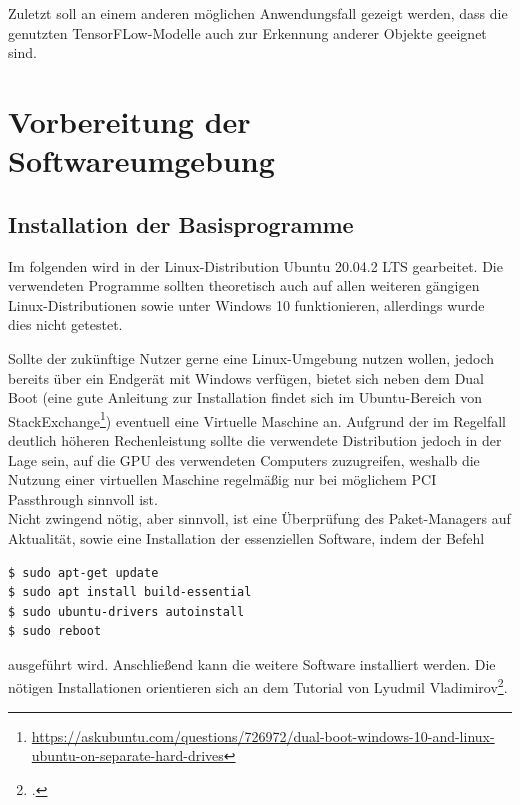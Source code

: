 \documentclass[12pt, oneside]{article}
\begin{document}
Zuletzt soll an einem anderen möglichen Anwendungsfall gezeigt werden, dass die genutzten TensorFLow-Modelle auch zur Erkennung anderer Objekte geeignet sind.






\newpage

\section{Vorbereitung der Softwareumgebung}

\subsection{Installation der Basisprogramme}

Im folgenden wird in der Linux-Distribution Ubuntu 20.04.2 LTS gearbeitet. Die verwendeten Programme sollten theoretisch auch auf allen weiteren gängigen Linux-Distributionen sowie unter Windows 10 funktionieren, allerdings wurde dies nicht getestet.

Sollte der zukünftige Nutzer gerne eine Linux-Umgebung nutzen wollen, jedoch bereits über ein Endgerät mit Windows verfügen, bietet sich neben dem Dual Boot (eine gute Anleitung zur Installation findet sich im Ubuntu-Bereich von StackExchange\footnote{\href{https://askubuntu.com/questions/726972/dual-boot-windows-10-and-linux-ubuntu-on-separate-hard-drives}{https://askubuntu.com/questions/726972/dual-boot-windows-10-and-linux-ubuntu-on-separate-hard-drives}}) eventuell eine Virtuelle Maschine an. Aufgrund der im Regelfall deutlich höheren Rechenleistung sollte die verwendete Distribution jedoch in der Lage sein, auf die GPU des verwendeten Computers zuzugreifen, weshalb die Nutzung einer virtuellen Maschine regelmäßig nur bei möglichem PCI Passthrough sinnvoll ist.\\

Nicht zwingend nötig, aber sinnvoll, ist eine Überprüfung des Paket-Managers auf Aktualität, sowie eine Installation der essenziellen Software, indem der Befehl

\begin{verbatim}
$ sudo apt-get update
$ sudo apt install build-essential
$ sudo ubuntu-drivers autoinstall 
$ sudo reboot 
\end{verbatim}

ausgeführt wird. Anschließend kann die weitere Software installiert werden. Die nötigen Installationen orientieren sich an dem Tutorial von Lyudmil Vladimirov\footcite{tf_tutorial}.\\
\end{document}
